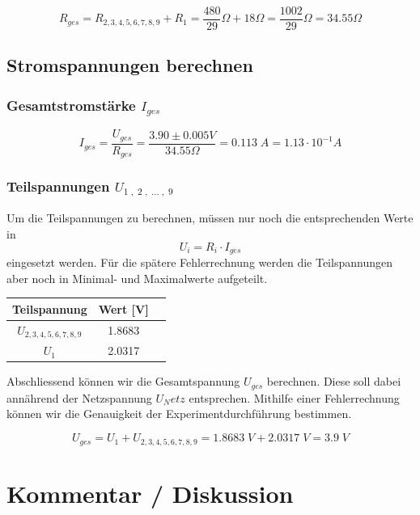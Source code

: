 \documentclass[a4paper,12pt]{article}
\begin{document}
$$R_{ges} = R_{2,3,4,5,6,7,8,9} + R_1 = \frac{480}{29}\Omega + 18\Omega = \frac{1002}{29}\Omega = 34.55\Omega$$

\newpage

\subsection{Stromspannungen berechnen}

\subsubsection{Gesamtstromstärke $I_{ges}$}

$$I_{ges} = \frac{U_{ges}}{R_{ges}} = \frac{3.90 \pm 0.005 V}{34.55\Omega} = 0.113 \;A = 1.13 \cdot 10^{-1} A$$

\subsubsection{Teilspannungen $U_{1\;,\;2\;,\; ...\;,\; 9}$}

Um die Teilspannungen zu berechnen, müssen nur noch die entsprechenden Werte in $$U_{i} = R_{i}\cdot I_{ges}$$ eingesetzt werden. Für die spätere Fehlerrechnung werden die Teilspannungen aber noch in Minimal- und Maximalwerte aufgeteilt.\\

\begin{table}[H]
    \centering
    \begin{tabular}{|c|c|c|}
        \hline
        \textbf{Teilspannung} & \textbf{Wert [V]}\\
        \hline
        $U_{2,3,4,5,6,7,8,9}$ & 1.8683\\
        \hline
        $U_{1}$ & 2.0317 \\
        \hline
    \end{tabular}
\end{table}

Abschliessend können wir die Gesamtspannung $U_{ges}$ berechnen. Diese soll dabei annährend der Netzspannung $U_Netz$ entsprechen. Mithilfe einer Fehlerrechnung können wir die Genauigkeit der Experimentdurchführung bestimmen.


$$U_{ges} = U_1 + U_{2,3,4,5,6,7,8,9} = 1.8683\; V + 2.0317\; V = 3.9\; V$$


\section{Kommentar / Diskussion}
\end{document}
